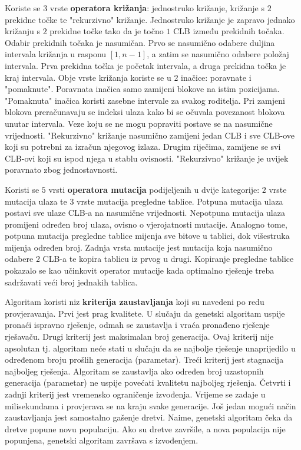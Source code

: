\documentclass[times, utf8, diplomski]{fer}
\begin{document}
Koriste se $3$ vrste \textbf{operatora križanja}: jednostruko križanje, križanje s $2$ prekidne točke te "rekurzivno" križanje. Jednostruko križanje je zapravo jednako križanju s $2$ prekidne točke tako da je točno $1$ CLB između prekidnih točaka. Odabir prekidnih točaka je nasumičan. Prvo se nasumično odabere duljina intervala križanja u rasponu $[1, n-1]$, a zatim se nasumično odabere položaj intervala. Prva prekidna točka je početak intervala, a druga prekidna točka je kraj intervala. Obje vrste križanja koriste se u $2$ inačice: poravnate i "pomaknute". Poravnata inačica samo zamijeni blokove na istim pozicijama. "Pomaknuta" inačica koristi zasebne intervale za svakog roditelja. Pri zamjeni blokova preračunavaju se indeksi ulaza kako bi se očuvala povezanost blokova unutar intervala. Veze koju se ne mogu popraviti postave se na nasumične vrijednosti. "Rekurzivno" križanje nasumično zamijeni jedan CLB i sve CLB-ove koji su potrebni za izračun njegovog izlaza. Drugim riječima, zamijene se svi CLB-ovi koji su ispod njega u stablu ovisnosti. "Rekurzivno" križanje je uvijek poravnato zbog jednostavnosti.

Koristi se $5$ vrsti \textbf{operatora mutacija} podijeljenih u dvije kategorije: $2$ vrste mutacija ulaza te $3$ vrste mutacija pregledne tablice. Potpuna mutacija ulaza postavi sve ulaze CLB-a na nasumične vrijednosti. Nepotpuna mutacija ulaza promijeni određen broj ulaza, ovisno o vjerojatnosti mutacije. Analogno tome, potpuna mutacija pregledne tablice mijenja sve bitove u tablici, dok višestruka mijenja određen broj. Zadnja vrsta mutacije jest mutacija koja nasumično odabere $2$ CLB-a te kopira tablicu iz prvog u drugi. Kopiranje pregledne tablice pokazalo se kao učinkovit operator mutacije kada optimalno rješenje treba sadržavati veći broj jednakih tablica.

Algoritam koristi niz \textbf{kriterija zaustavljanja} koji su navedeni po redu provjeravanja. Prvi jest prag kvalitete. U slučaju da genetski algoritam uspije pronaći ispravno rješenje, odmah se zaustavlja i vraća pronađeno rješenje rješavaču. Drugi kriterij jest maksimalan broj generacija. Ovaj kriterij nije apsolutan tj. algoritam neće stati u slučaju da se najbolje rješenje unaprijedilo u određenom broju prošlih generacija (parametar). Treći kriterij jest stagnacija najboljeg rješenja. Algoritam se zaustavlja ako određen broj uzastopnih generacija (parametar) ne uspije povećati kvalitetu najboljeg rješenja. Četvrti i zadnji kriterij jest vremensko ograničenje izvođenja. Vrijeme se zadaje u milisekundama i provjerava se na kraju svake generacije. Još jedan mogući način zaustavljanja jest samostalno gašenje dretvi. Naime, genetski algoritam čeka da dretve popune novu populaciju. Ako su dretve završile, a nova populacija nije popunjena, genetski algoritam završava s izvođenjem.
\end{document}
